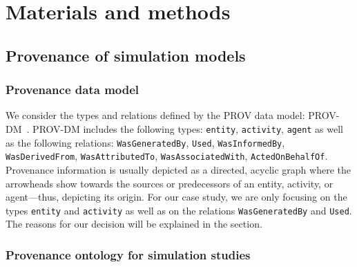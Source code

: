 \documentclass[10pt,letterpaper]{article}
\begin{document}
\section*{Materials and methods}\label{sec:MaterialsAndMethods}

\subsection*{Provenance of simulation models}

\subsubsection*{Provenance data model}

We consider the types and relations defined by the PROV data model: PROV-DM~\cite{Belhajjame2013}.
PROV-DM includes the following types: \texttt{entity}, \texttt{activity}, \texttt{agent} as well as the following relations: \texttt{WasGeneratedBy}, \texttt{Used}, \texttt{WasInformedBy}, \texttt{WasDerivedFrom}, \texttt{WasAttributedTo}, \texttt{WasAssociatedWith}, \texttt{ActedOnBehalfOf}.
Provenance information is usually depicted as a directed, acyclic graph where the arrowheads show towards the sources or predecessors of an entity, activity, or agent---thus, depicting its origin.
For our case study, we are only focusing on the types \texttt{entity} and \texttt{activity} as well as on the relations \texttt{WasGeneratedBy} and \texttt{Used}.
The reasons for our decision will be explained in the  section.


\subsubsection*{Provenance ontology for simulation studies}
\end{document}

